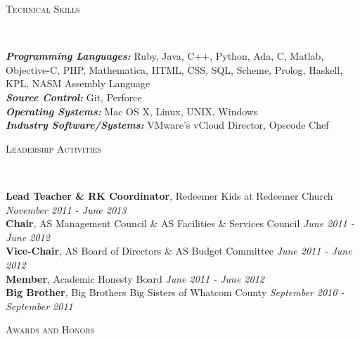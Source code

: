 \documentclass[9pt]{article}
\newenvironment{changemargin}[2]{%
  \begin{list}{}{%
    \setlength{\topsep}{0pt}%
    \setlength{\leftmargin}{#1}%
    \setlength{\rightmargin}{#2}%
    \setlength{\listparindent}{\parindent}%
    \setlength{\itemindent}{\parindent}%
    \setlength{\parsep}{\parskip}%
  }%
  \item[]}{\end{list}
}
\newcommand{\lineover}{
	\begin{changemargin}{-0.05in}{-0.05in}
		\vspace*{-8pt}
		\hrulefill \\
		\vspace*{-2pt}
	\end{changemargin}
}
\newcommand{\header}[1]{
	\begin{changemargin}{-0.5in}{-0.5in}
		\scshape{#1}\\
  		\lineover
	\end{changemargin}
}
\newenvironment{body} {
	\vspace*{-16pt}
	\begin{changemargin}{-0.20in}{-0.5in}
  }	
	{\end{changemargin}
}
\begin{document}


\header{Technical Skills}
\begin{body}
	\vspace{14pt}
	\emph{\textbf{Programming Languages:}}{} Ruby, Java, C++, Python, Ada, C, Matlab, Objective-C, PHP, Mathematica, HTML, CSS, SQL, Scheme, Prolog, Haskell, KPL, NASM Assembly Language\\
	\medskip
	\emph{\textbf{Source Control:}}{} Git, Perforce\\
	\medskip
	\emph{\textbf{Operating Systems:}}{} Mac OS X, Linux, UNIX, Windows\\
	\medskip
	\emph{\textbf{Industry Software/Systems:}}{} VMware's vCloud Director, Opscode Chef\\
\end{body}

\smallskip


\header{Leadership Activities}

\begin{body}
	\vspace{14pt}
	\textbf{Lead Teacher \& RK Coordinator}, Redeemer Kids at Redeemer Church \hfill{} \emph{November 2011 - June 2013}\\
	\smallskip
	\textbf{Chair}, AS Management Council \& AS Facilities \& Services Council \hfill {} \emph{June 2011 - June 2012}\\
	\smallskip
	\textbf{Vice-Chair}, AS Board of Directors \& AS Budget Committee \hfill {} \emph{June 2011 - June 2012}\\
	\smallskip
	\textbf{Member}, Academic Honesty Board \hfill{} \emph{June 2011 - June 2012}\\
	\smallskip
	\textbf{Big Brother}, Big Brothers Big Sisters of Whatcom County \hfill{} \emph{September 2010 - September 2011}\\
\end{body}

\smallskip

\newpage


\header{Awards and Honors}
\end{document}
